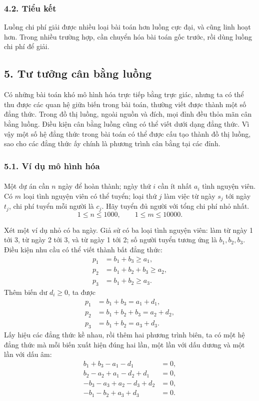 \documentclass[11pt]{article}
\begin{document}
\subsubsection*{4.2. Tiểu kết}

Luồng chi phí giải được nhiều loại bài toán hơn luồng cực đại, và cũng linh
hoạt hơn. Trong nhiều trường hợp, cần chuyển hóa bài toán gốc trước, rồi dùng
luồng chi phí để giải.

\subsection*{5. Tư tưởng cân bằng luồng}

Có những bài toán khó mô hình hóa trực tiếp bằng trực giác, nhưng ta có thể
thu được các quan hệ giữa biến trong bài toán, thường viết được thành một số
đẳng thức. Trong đồ thị luồng, ngoài nguồn và đích, mọi đỉnh đều thỏa mãn cân
bằng luồng. Điều kiện cân bằng luồng cũng có thể viết dưới dạng đẳng thức.
Vì vậy một số hệ đẳng thức trong bài toán có thể được cấu tạo thành đồ thị
luồng, sao cho các đẳng thức ấy chính là phương trình cân bằng tại các đỉnh.

\subsubsection*{5.1. Ví dụ mô hình hóa}

\paragraph{}
Một dự án cần \(n\) ngày để hoàn thành; ngày thứ \(i\) cần ít nhất \(a_i\)
tình nguyện viên. Có \(m\) loại tình nguyện viên có thể tuyển; loại thứ
\(j\) làm việc từ ngày \(s_j\) tới ngày \(t_j\), chi phí tuyển mỗi người là
\(c_j\). Hãy tuyển đủ người với tổng chi phí nhỏ nhất.
\[
  1\le n\le 1000,\qquad 1\le m\le 10000.
\]

Xét một ví dụ nhỏ có ba ngày. Giả sử có ba loại tình nguyện viên: làm từ ngày
1 tới 3, từ ngày 2 tới 3, và từ ngày 1 tới 2; số người tuyển tương ứng là
\(b_1,b_2,b_3\). Điều kiện nhu cầu có thể viết thành bất đẳng thức:
\[
\begin{aligned}
  p_1 &= b_1+b_3\ge a_1,\\
  p_2 &= b_1+b_2+b_3\ge a_2,\\
  p_3 &= b_1+b_2\ge a_3.
\end{aligned}
\]
Thêm biến dư \(d_i\ge 0\), ta được
\[
\begin{aligned}
  p_1 &= b_1+b_3=a_1+d_1,\\
  p_2 &= b_1+b_2+b_3=a_2+d_2,\\
  p_3 &= b_1+b_2=a_3+d_3.
\end{aligned}
\]
Lấy hiệu các đẳng thức kề nhau, rồi thêm hai phương trình biên, ta có một hệ
đẳng thức mà mỗi biến xuất hiện đúng hai lần, một lần với dấu dương và một
lần với dấu âm:
\[
\begin{aligned}
  b_1+b_3-a_1-d_1 &=0,\\
  b_2-a_2+a_1-d_2+d_1 &=0,\\
  -b_3-a_3+a_2-d_3+d_2 &=0,\\
  -b_1-b_2+a_3+d_3 &=0.
\end{aligned}
\]
\end{document}
